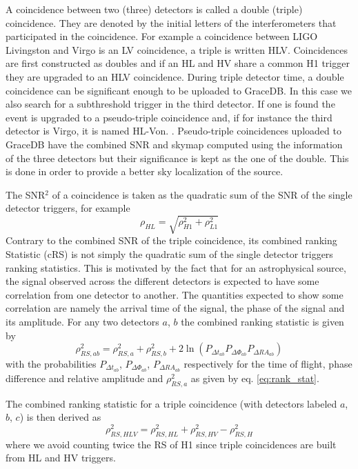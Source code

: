 A coincidence between two (three) detectors is called a double (triple) coincidence.
They are denoted by the initial letters of the interferometers that participated in the coincidence.
For example a coincidence between LIGO Livingston and Virgo is an LV coincidence, a triple is written HLV.
Coincidences are first constructed as doubles and if an HL and HV share a common H1 trigger they are upgraded to an HLV coincidence.
During triple detector time, a double coincidence can be significant enough to be uploaded to GraceDB.
In this case we also search for a subthreshold trigger in the third detector.
If one is found the event is upgraded to a pseudo-triple coincidence and, if for instance the third detector is Virgo, it is named HL-Von. .
Pseudo-triple coincidences uploaded to GraceDB have the combined SNR and skymap computed using the information of the three detectors but their significance is kept as the one of the double.
This is done in order to provide a better sky localization of the source.

The SNR$^2$ of a coincidence is taken as the quadratic sum of the SNR of the single detector triggers, for example
%
\begin{equation}
  \rho_{HL} = \sqrt{\rho^2_{H1} + \rho^2_{L1}}
\end{equation}
%
Contrary to the combined SNR of the triple coincidence, its combined ranking Statistic (cRS) is not simply the quadratic sum of the single detector triggers ranking statistics.
This is motivated by the fact that for an astrophysical source, the signal observed across the different detectors is expected to have some correlation from one detector to another.
The quantities expected to show some correlation are namely the arrival time of the signal, the phase of the signal and its amplitude.
For any two detectors $a$, $b$ the combined ranking statistic is given by
%
\begin{equation}
  \rho^2_{RS,ab} = \rho^2_{RS,a} + \rho^2_{RS,b} + 2\ln\left(P_{\Delta t_{ab}} P_{\Delta \Phi_{ab}} P_{\Delta RA_{ab}}\right)
  \label{eq:CRS_double}
\end{equation}
%
with the probabilities $P_{\Delta t_{ab}}$, $P_{\Delta \Phi_{ab}}$, $P_{\Delta RA_{ab}}$ respectively for the time of flight, phase difference and relative amplitude and $\rho^2_{RS,a}$ as given by eq. \ref{eq:rank_stat}.

The combined ranking statistic for a triple coincidence (with detectors labeled $a$, $b$, $c$) is then derived as
%
\begin{equation}
  \rho^2_{RS,HLV} = \rho^2_{RS,HL} + \rho^2_{RS,HV} - \rho^2_{RS,H}
  \label{eq:CRS_triple}
\end{equation}
%
where we avoid counting twice the RS of H1 since triple coincidences are built from HL and HV triggers.

